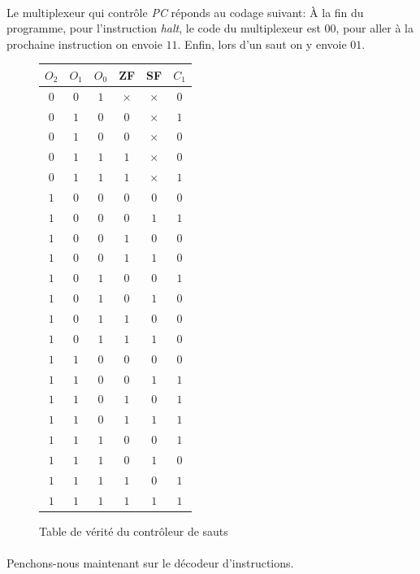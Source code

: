 \paragraph{}{
	Le multiplexeur qui contrôle \textit{PC} réponds au codage suivant:
	À la fin du programme, pour l'instruction \textit{halt}, le code du
	multiplexeur est $00$, pour aller à la prochaine instruction on envoie
	$11$. Enfin, lors d'un saut on y envoie $01$.
}

\begin{figure}
	\centering
	\begin{tabular}{|c|c|c|c|c|c|}
		\hline 
		$O_{2}$ & $O_{1}$ & $O_{0}$ & ZF & SF & $C_{1}$ \\ 
		\hline 
		$0$ & $0$ & $1$ & $\times$ & $\times$ & $0$ \\ 
		\hline 
		$0$ & $1$ & $0$ & $0$ & $\times$ & $1$ \\ 
		\hline 
		$0$ & $1$ & $0$ & $0$ & $\times$ & $0$ \\ 
		\hline 
		$0$ & $1$ & $1$ & $1$ & $\times$ & $0$ \\ 
		\hline 
		$0$ & $1$ & $1$ & $1$ & $\times$ & $1$ \\ 
		\hline 
		$1$ & $0$ & $0$ & $0$ & $0$ & $0$ \\ 
		\hline 
		$1$ & $0$ & $0$ & $0$ & $1$ & $1$ \\ 
		\hline 
		$1$ & $0$ & $0$ & $1$ & $0$ & $0$ \\ 
		\hline 
		$1$ & $0$ & $0$ & $1$ & $1$ & $0$ \\ 
		\hline 
		$1$ & $0$ & $1$ & $0$ & $0$ & $1$ \\ 
		\hline 
		$1$ & $0$ & $1$ & $0$ & $1$ & $0$ \\ 
		\hline 
		$1$ & $0$ & $1$ & $1$ & $0$ & $0$ \\ 
		\hline 
		$1$ & $0$ & $1$ & $1$ & $1$ & $0$ \\ 
		\hline 
		$1$ & $1$ & $0$ & $0$ & $0$ & $0$ \\ 
		\hline 
		$1$ & $1$ & $0$ & $0$ & $1$ & $1$ \\ 
		\hline 
		$1$ & $1$ & $0$ & $1$ & $0$ & $1$ \\ 
		\hline 
		$1$ & $1$ & $0$ & $1$ & $1$ & $1$ \\ 
		\hline 
		$1$ & $1$ & $1$ & $0$ & $0$ & $1$ \\ 
		\hline 
		$1$ & $1$ & $1$ & $0$ & $1$ & $0$ \\ 
		\hline 
		$1$ & $1$ & $1$ & $1$ & $0$ & $1$ \\ 
		\hline 
		$1$ & $1$ & $1$ & $1$ & $1$ & $1$ \\ 
		\hline 
	\end{tabular} 
	\caption{
		\label{ctrl_saut_tv}
		Table de vérité du contrôleur de sauts
	}
\end{figure}

\paragraph{}{
	Penchons-nous maintenant sur le décodeur d'instructions.
}